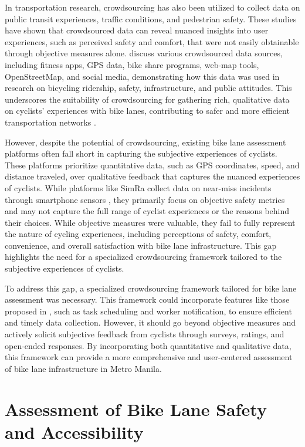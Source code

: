 In transportation research, crowdsourcing has also been utilized to collect data on public transit experiences, traffic conditions, and pedestrian safety. These studies have shown that crowdsourced data can reveal nuanced insights into user experiences, such as perceived safety and comfort, that were not easily obtainable through objective measures alone. \citet{Nelson:2020} discuss various crowdsourced data sources, including fitness apps, GPS data, bike share programs, web-map tools, OpenStreetMap, and social media, demonstrating how this data was used in research on bicycling ridership, safety, infrastructure, and public attitudes. This underscores the suitability of crowdsourcing for gathering rich, qualitative data on cyclists' experiences with bike lanes, contributing to safer and more efficient transportation networks \citep{Misra:2014}.

However, despite the potential of crowdsourcing, existing bike lane assessment platforms often fall short in capturing the subjective experiences of cyclists. These platforms prioritize quantitative data, such as GPS coordinates, speed, and distance traveled, over qualitative feedback that captures the nuanced experiences of cyclists. While platforms like SimRa collect data on near-miss incidents through smartphone sensors \citep{Karakaya:2020}, they primarily focus on objective safety metrics and may not capture the full range of cyclist experiences or the reasons behind their choices. While objective measures were valuable, they fail to fully represent the nature of cycling experiences, including perceptions of safety, comfort, convenience, and overall satisfaction with bike lane infrastructure. This gap highlights the need for a specialized crowdsourcing framework tailored to the subjective experiences of cyclists.

To address this gap, a specialized crowdsourcing framework tailored for bike lane assessment was necessary. This framework could incorporate features like those proposed in \citet{Cheng:2018}, such as task scheduling and worker notification, to ensure efficient and timely data collection. However, it should go beyond objective measures and actively solicit subjective feedback from cyclists through surveys, ratings, and open-ended responses. By incorporating both quantitative and qualitative data, this framework can provide a more comprehensive and user-centered assessment of bike lane infrastructure in Metro Manila.

\section{Assessment of Bike Lane Safety and Accessibility }

